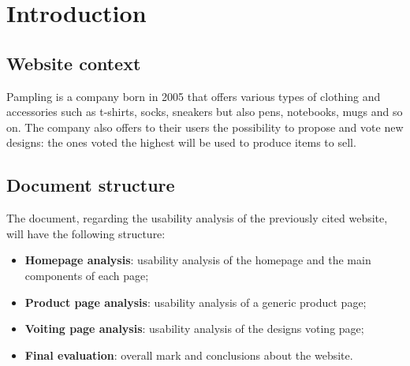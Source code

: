 \section{Introduction}

\subsection{Website context}
Pampling is a company born in 2005 that offers various types of clothing and accessories such as t-shirts, socks, sneakers but also pens, notebooks, mugs and so on. 
The company also offers to their users the possibility to propose and vote new designs: the ones voted the highest will be used to produce items to sell.

\subsection{Document structure}
The document, regarding the usability analysis of the previously cited website, will have the following structure:
\begin{itemize}
\item \textbf{Homepage analysis}: usability analysis of the homepage and the main components of each page;
\item \textbf{Product page analysis}: usability analysis of a generic product page;
\item \textbf{Voiting page analysis}: usability analysis of the designs voting page;
\item \textbf{Final evaluation}: overall mark and conclusions about the website.
\end{itemize}



